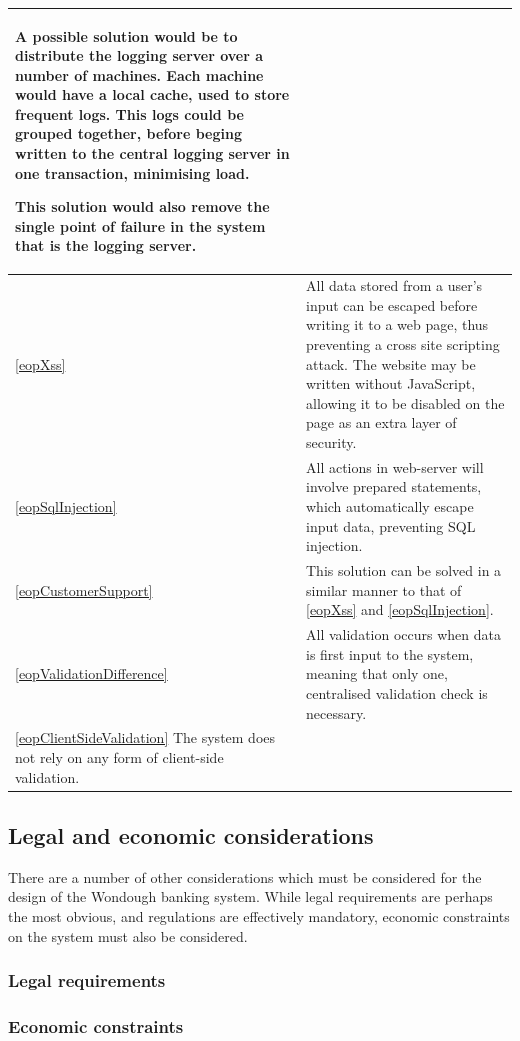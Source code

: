 \begin{longtable}{|| p{} | p{} ||}
        A possible solution would be to distribute the logging server over a number of machines. Each machine would have a local cache, used to store frequent logs. This logs could be grouped together, before beging written to the central logging server in one transaction, minimising load.

        This solution would also remove the single point of failure in the system that is the logging server.
    \\ \hline \ref{eopXss} &
        All data stored from a user's input can be escaped before writing it to a web page, thus preventing a cross site scripting attack. The website may be written without JavaScript, allowing it to be disabled on the page as an extra layer of security.
    \\ \hline \ref{eopSqlInjection} &
        All actions in web-server will involve prepared statements, which automatically escape input data, preventing SQL injection.
    \\ \hline \ref{eopCustomerSupport} &
        This solution can be solved in a similar manner to that of \ref{eopXss} and \ref{eopSqlInjection}.
    \\ \hline \ref{eopValidationDifference} & 
        All validation occurs when data is first input to the system, meaning that only one, centralised validation check is necessary.
    \\ \hline \ref{eopClientSideValidation}
        The system does not rely on any form of client-side validation.
    \\

\end{longtable}

\subsection{Legal and economic considerations}

There are a number of other considerations which must be considered for the design of the Wondough banking system. While legal requirements are perhaps the most obvious, and regulations are effectively mandatory, economic constraints on the system must also be considered.

\subsubsection{Legal requirements}



\subsubsection{Economic constraints}

